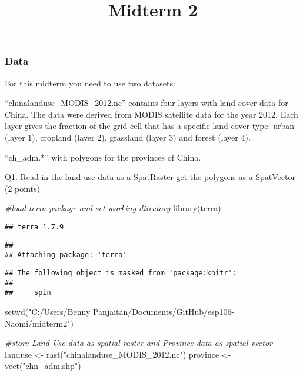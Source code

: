 \documentclass[
]{article}
\title{Midterm 2}
\author{}
\date{\vspace{-2.5em}}
\newenvironment{Shaded}{\begin{snugshade}}{\end{snugshade}}
\newcommand{\CommentTok}[1]{\textcolor[rgb]{0.56,0.35,0.01}{\textit{#1}}}
\newcommand{\FunctionTok}[1]{\textcolor[rgb]{0.00,0.00,0.00}{#1}}
\newcommand{\NormalTok}[1]{#1}
\newcommand{\OtherTok}[1]{\textcolor[rgb]{0.56,0.35,0.01}{#1}}
\newcommand{\StringTok}[1]{\textcolor[rgb]{0.31,0.60,0.02}{#1}}
\begin{document}
\maketitle

\hypertarget{data}{%
\subsubsection{Data}\label{data}}

For this midterm you need to use two datasets:

``chinalanduse\_MODIS\_2012.nc'' contains four layers with land cover
data for China. The data were derived from MODIS satellite data for the
year 2012. Each layer gives the fraction of the grid cell that has a
specific land cover type: urban (layer 1), cropland (layer 2), grassland
(layer 3) and forest (layer 4).

``ch\_adm.*'' with polygons for the provinces of China.

Q1. Read in the land use data as a SpatRaster get the polygons as a
SpatVector (2 points)

\begin{Shaded}
\begin{Highlighting}[]
\CommentTok{\#load terra package and set working directory}
\FunctionTok{library}\NormalTok{(terra)}
\end{Highlighting}
\end{Shaded}

\begin{verbatim}
## terra 1.7.9
\end{verbatim}

\begin{verbatim}
## 
## Attaching package: 'terra'
\end{verbatim}

\begin{verbatim}
## The following object is masked from 'package:knitr':
## 
##     spin
\end{verbatim}

\begin{Shaded}
\begin{Highlighting}[]
\FunctionTok{setwd}\NormalTok{(}\StringTok{"C:/Users/Benny Panjaitan/Documents/GitHub/esp106{-}Naomi/midterm2"}\NormalTok{)}

\CommentTok{\#store Land Use data as spatial raster and Province data as spatial vector}
\NormalTok{landuse }\OtherTok{\textless{}{-}} \FunctionTok{rast}\NormalTok{(}\StringTok{"chinalanduse\_MODIS\_2012.nc"}\NormalTok{)}
\NormalTok{province }\OtherTok{\textless{}{-}} \FunctionTok{vect}\NormalTok{(}\StringTok{"chn\_adm.shp"}\NormalTok{)}
\end{Highlighting}
\end{Shaded}
\end{document}
